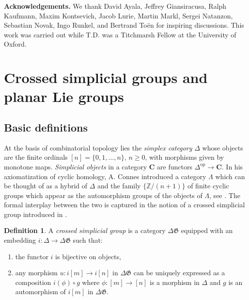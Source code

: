 \documentclass[english,11pt,leqno]{article}
\def\ZZ{\mathbb{Z}}
\def\Gen{\mathfrak{G}}
\def\Cb{\mathbf{C}}
\def\op{{\operatorname{op}}}
\theoremstyle{definition}
\newtheorem{defi}[thm]{Definition}
\theoremstyle{remark}
\numberwithin{equation}{section}
\begin{document}
\noindent
{\bf Acknowledgements.} We thank David Ayala, Jeffrey Giansiracusa, Ralph Kaufmann, Maxim
Kontsevich, Jacob Lurie, Martin Markl, Sergei Natanzon, Sebastian Novak, Ingo Runkel, and Bertrand To\"en for inspiring
discussions. This work was carried out while T.D. was a Titchmarsh Fellow at the University
of Oxford.

\newpage

\section{Crossed simplicial groups and planar Lie groups}


\subsection{Basic definitions}

At the basis of combinatorial topology lies the {\em simplex category} $\Delta$ whose objects are
the finite ordinals $[n]=\{0,1,\dots, n\}$, $n \ge 0$, with morphisms given by monotone maps.
{\em Simplicial objects} in a category $\Cb$ are functors $\Delta^\op\to\Cb$. In his axiomatization
of cyclic homology, A. Connes introduced a category $\Lambda$ which can be thought of as a hybrid of
$\Delta$ and the family $\{ \ZZ /(n+1) \}$ of finite cyclic groups which appear as the automorphism
groups of the objects of $\Lambda$, see \cite{connes, loday}. The formal interplay between the two
is captured in the notion of a crossed simplicial group introduced in \cite{fiedorowicz-loday,
krasauskas}.

\begin{defi} \label{defi:csg} A {\em crossed simplicial group} is a category $\Delta \Gen$ equipped with an embedding
	$i:\Delta \to \Delta \Gen$ such that:
	\begin{enumerate}
		\item the functor $i$ is bijective on objects,
		\item any morphism $u: i[m] \to i[n]$ in $\Delta \Gen$ can be uniquely expressed as 
			a composition $i(\phi) \circ g$ where $\phi: [m] \to [n]$ is a morphism in
			$\Delta$ and $g$ is an automorphism of $i[m]$ in $\Delta \Gen$.
	\end{enumerate}
\end{defi}
\end{document}
